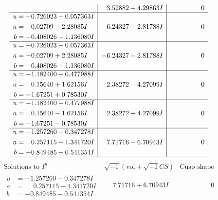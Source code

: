 \documentclass[1p]{elsarticle_modified}
\theoremstyle{definition}
\newcommand{\I}{\sqrt{-1}}
\begin{document}
$$\begin{array}{c|c|c}
 & \phantom{-}3.52882 + 4.29863 I & \phantom{-0.000000 } 0 \\ \hline\begin{aligned}
u &= -0.726023 + 0.057363 I \\
a &= -0.02709 - 2.28085 I \\
b &= -0.408026 - 1.136080 I\end{aligned}
 & -6.24327 + 2.81788 I & \phantom{-0.000000 } 0 \\ \hline\begin{aligned}
u &= -0.726023 - 0.057363 I \\
a &= -0.02709 + 2.28085 I \\
b &= -0.408026 + 1.136080 I\end{aligned}
 & -6.24327 - 2.81788 I & \phantom{-0.000000 } 0 \\ \hline\begin{aligned}
u &= -1.182400 + 0.477988 I \\
a &= \phantom{-}0.15640 + 1.62156 I \\
b &= -1.67251 + 0.78530 I\end{aligned}
 & \phantom{-}2.38272 - 4.27099 I & \phantom{-0.000000 } 0 \\ \hline\begin{aligned}
u &= -1.182400 - 0.477988 I \\
a &= \phantom{-}0.15640 - 1.62156 I \\
b &= -1.67251 - 0.78530 I\end{aligned}
 & \phantom{-}2.38272 + 4.27099 I & \phantom{-0.000000 } 0 \\ \hline\begin{aligned}
u &= -1.257260 + 0.347278 I \\
a &= \phantom{-}0.257115 + 1.341720 I \\
b &= -0.849485 + 0.541354 I\end{aligned}
 & \phantom{-}7.71716 - 6.70943 I & \phantom{-0.000000 } 0\\
 \hline 
 \end{array}$$\newpage$$\begin{array}{c|c|c}  
\text{Solutions to }I^u_{1}& \I (\text{vol} + \sqrt{-1}CS) & \text{Cusp shape}\\
 \hline 
\begin{aligned}
u &= -1.257260 - 0.347278 I \\
a &= \phantom{-}0.257115 - 1.341720 I \\
b &= -0.849485 - 0.541354 I\end{aligned}
 & \phantom{-}7.71716 + 6.70943 I & \phantom{-0.000000 } 0 \\ \hline\begin{aligned}

\end{aligned}
\end{array}$$
\end{document}
